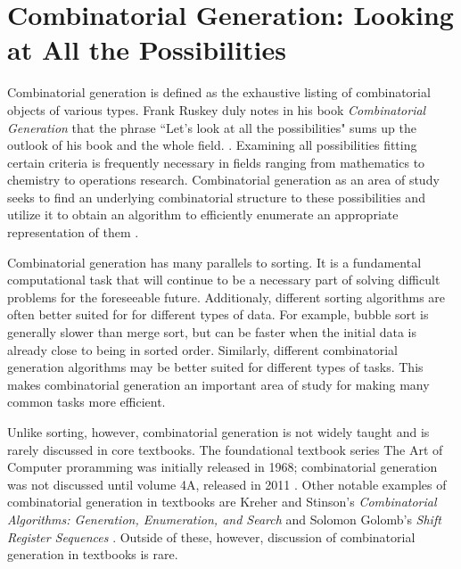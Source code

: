 \section{Combinatorial Generation: Looking at All the Possibilities}

Combinatorial generation is defined as the exhaustive listing of combinatorial objects of various types.  Frank Ruskey duly notes in his book \emph{Combinatorial Generation} that the phrase ``Let's look at all the possibilities" sums up the outlook of his book and the whole field. \cite{ruskey2003combinatorial}. Examining all possibilities fitting certain criteria is frequently necessary in fields ranging from mathematics to chemistry to operations research. Combinatorial generation as an area of study seeks to find an underlying combinatorial structure to these possibilities and utilize it to obtain an algorithm to efficiently enumerate an appropriate representation of them \cite{ruskey2003combinatorial}. 

Combinatorial generation has many parallels to sorting.  It is a fundamental computational task that will continue to be a necessary part of solving difficult problems for the foreseeable future.  Additionaly, different sorting algorithms are often better suited for for different types of data.  For example, bubble sort is generally slower than merge sort, but can be faster when the initial data is already close to being in sorted order. Similarly, different combinatorial generation algorithms may be better suited for different types of tasks.  This makes combinatorial generation an important area of study for making many common tasks more efficient.  

Unlike sorting, however, combinatorial generation is not widely taught and is rarely discussed in core textbooks. The foundational textbook series The Art of Computer proramming was initially released in 1968; combinatorial generation was not discussed until volume 4A, released in 2011 \cite{knuth2015art}.  Other notable examples of combinatorial generation in textbooks are Kreher and Stinson's \emph{Combinatorial Algorithms: Generation, Enumeration, and Search} \cite{kreher2020combinatorial} and Solomon Golomb's \emph{Shift Register Sequences} \cite{golomb1967shift}. Outside of these, however, discussion of combinatorial generation in textbooks is rare.

